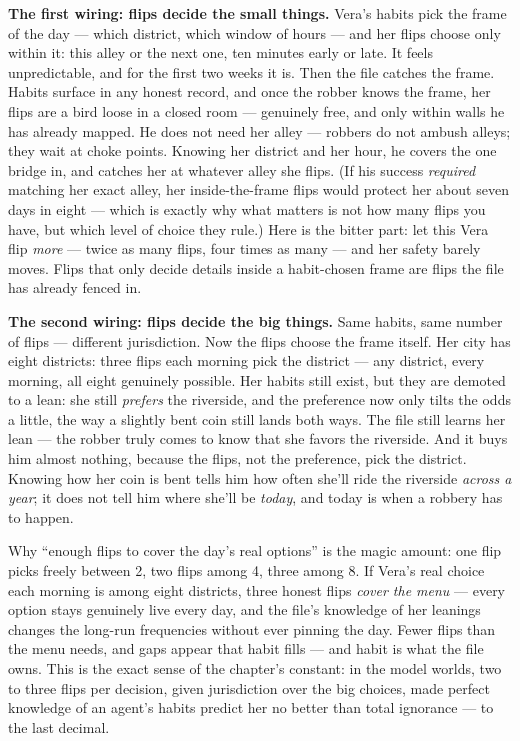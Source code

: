 \textbf{The first wiring: flips decide the small things.} Vera's habits
pick the frame of the day --- which district, which window of hours ---
and her flips choose only within it: this alley or the next one, ten
minutes early or late. It feels unpredictable, and for the first two
weeks it is. Then the file catches the frame. Habits surface in any
honest record, and once the robber knows the frame, her flips are a
bird loose in a closed room --- genuinely free, and only within walls he
has already mapped. He does not need her alley --- robbers do not ambush alleys; they wait
at choke points. Knowing her district and her hour, he covers the one
bridge in, and catches her at whatever alley she flips. (If his
success \emph{required} matching her exact alley, her inside-the-frame
flips would protect her about seven days in eight --- which is exactly
why what matters is not how many flips you have, but which level of
choice they rule.) Here is the bitter part:
let this Vera flip \emph{more} --- twice as many flips, four times as many ---
and her safety barely moves. Flips that only decide details inside a
habit-chosen frame are flips the file has already fenced in.

\textbf{The second wiring: flips decide the big things.} Same habits, same
number of flips --- different jurisdiction. Now the flips choose the
frame itself. Her city has eight districts: three flips each morning
pick the district --- any district, every morning, all eight genuinely
possible. Her habits still exist, but they are demoted to a lean: she
still \emph{prefers} the riverside, and the preference now only tilts the
odds a little, the way a slightly bent coin still lands both ways.
The file still learns her lean --- the robber truly comes to know that
she favors the riverside. And it buys him almost nothing, because the
flips, not the preference, pick the district. Knowing how her coin is
bent tells him how often she'll ride the riverside \emph{across a year};
it does not tell him where she'll be \emph{today}, and today is when a
robbery has to happen.


Why ``enough flips to cover the day's real options'' is the magic
amount: one flip picks freely between 2, two flips among 4, three
among 8. If Vera's real choice each morning is among eight districts,
three honest flips \emph{cover the menu} --- every option stays genuinely
live every day, and the file's knowledge of her leanings changes the
long-run frequencies without ever pinning the day. Fewer flips than
the menu needs, and gaps appear that habit fills --- and habit is what
the file owns. This is the exact sense of the chapter's constant:
in the model worlds, two to three flips per decision, given
jurisdiction over the big choices, made perfect knowledge of an
agent's habits predict her no better than total ignorance --- to the
last decimal.


